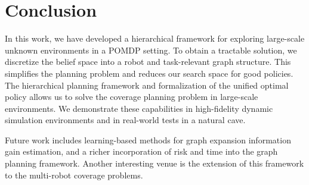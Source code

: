 \documentclass[letterpaper]{article} %
\begin{document}





\section{Conclusion}\label{sec:conclusion}



In this work, we have developed a hierarchical framework for exploring large-scale unknown environments in a POMDP setting. 
To obtain a tractable solution, we discretize the belief space into a robot and task-relevant graph structure. This simplifies the planning problem and reduces our search space for good policies.
The hierarchical planning framework and formalization of the unified optimal policy allows us to solve the coverage planning problem in large-scale environments.
We demonstrate these capabilities in high-fidelity dynamic simulation environments and in real-world tests in a natural cave.  

Future work includes learning-based methods for graph expansion information gain estimation, and a richer incorporation of risk and time into the graph planning framework. %
Another interesting venue is the extension of this framework to the multi-robot coverage problems.
\end{document}
